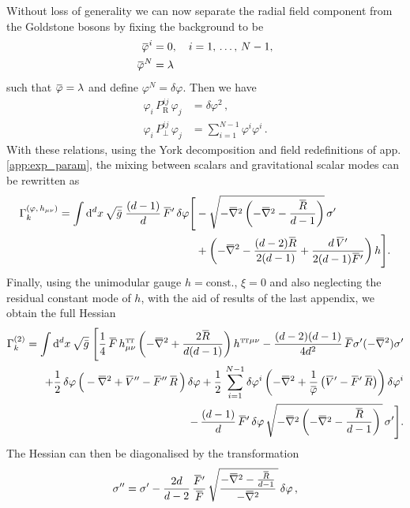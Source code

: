 \documentclass[11pt]{book}
\newcommand{\overbar}[1]{\mkern 1.5mu\overline{\mkern-1.5mu#1\mkern-1.5mu}\mkern 1.5mu}
\newcommand\TTspace{ -1pt }
\newcommand\TT{ \scriptscriptstyle{\mathrm{T\hspace{\TTspace}T}} }
\newcommand\hTTmunu{ h^{\scriptscriptstyle{\mathrm{T\hspace{\TTspace}T}}}_{\mu\nu} }
\newcommand{\bnabla}{\overbar \nabla}
\newcommand{\bR}{\overbar R}
\newcommand{\bV}{\overbar V}
\newcommand{\bF}{\overbar F}
\newcommand{\bp}{\overbar \varphi}
\newcommand{\deltap}{\delta \varphi}
\newcommand{\projR}{ P_{\scriptscriptstyle\mathrm R}^{ij} }
\newcommand{\projperp}{ P_{\scriptscriptstyle \perp}^{ij} }
\numberwithin{equation}{chapter}
\begin{document}
\begin{appendices}
Without loss of generality we can now separate the radial field component from the
Goldstone bosons by fixing the background to be
\begin{align}
  \bp^i &= 0, \quad i = 1,\, \dots,\, N-1, \\
  \bp^N &= \lambda
\end{align}
such that $\bp = \lambda$ and define $\varphi^N = \deltap$. Then we have
\begin{align}
  \varphi_i \, \projR    \, \varphi_j &= \deltap^2 \,, \\
  \varphi_i \, \projperp \, \varphi_j &= \sum_{i=1}^{N-1} \varphi^i \varphi^i \,.
\end{align}
With these relations, using the York decomposition and field redefinitions
of app. \ref{app:exp_param}, the mixing between scalars and gravitational scalar
modes can be rewritten as
\begin{align}
  \Gamma_k^{(\varphi,\, h_{\mu\nu})} =
  \int \mathrm{d}^d x \, \sqrt{\bar{g}} \;
  \frac{(d-1)}{d} \, \bF' \, \deltap
  \Bigg[
    &- \sqrt{-\bnabla^2 \left(-\bnabla^2-\frac{\bR}{d-1} \right)} \, \sigma' \nonumber \\
    &+
    \left(
      -\bnabla^2
      -\frac{(d-2) \bR}{2(d-1)}
      +\frac{d\,\bV'}{2(d-1) \bF'}
    \right)
    h
  \Bigg] .
\end{align}
Finally, using the unimodular gauge $h = \text{const.}$,
$\xi=0$ and also neglecting the residual constant mode of $h$,
with the aid of results of the last appendix,
we obtain the full Hessian
\begin{align}
  \Gamma_k^{(2)} = \int \mathrm d^d x \, \sqrt{\bar{g}} \;
  \Bigg[
    \frac{1}{4} \, \bF \, \hTTmunu \left( -\bnabla^2 + \frac{2 \bR}{d(d-1)} \right) h^{{\TT}\mu\nu}
    - \frac{(d-2)(d-1)}{4d^2} \, \bF \sigma^{\prime} (-\bnabla^2) \sigma^{\prime}
    \nonumber\\
    +\frac{1}{2} \, \deltap \, \Big( -\bnabla^2 + \bV'' - \bF'' \, \bR \, \Big) \, \deltap
    +\frac{1}{2} \, \sum_{i=1}^{N-1} \deltap^i
    \left(
      -\bnabla^2 +\frac{1}{\bp} \, \big( \bV' - \bF' \, \bR \big) \right) \deltap^i \nonumber \\
    - \, \frac{(d-1)}{d} \, \bF' \, \deltap \,
    \sqrt{ - \bnabla^2 \left( -\bnabla^2 - \frac{\bR}{d-1} \right) \, } \, \sigma^{\prime}
  \Bigg] .
  \label{oldHessian}
\end{align}
The Hessian can then be diagonalised by the transformation
\begin{align}
  \sigma^{\prime\prime} = \sigma^{\prime}
  -\frac{2d}{d-2} \, \frac{\bF'}{\bF} \, \sqrt{\frac{-\bnabla^2-\frac{\bR}{d-1}}{-\bnabla^2} \, } \, \deltap \,,

\end{align}
\end{appendices}
\end{document}
